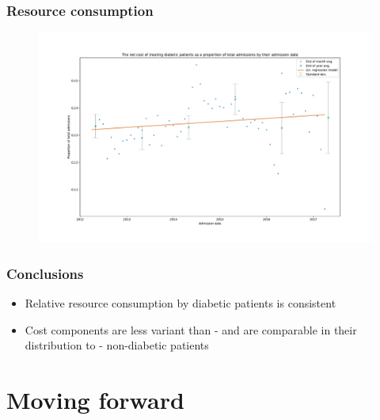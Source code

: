 \documentclass{beamer}
\begin{document}
\begin{frame}
    \frametitle{Resource consumption}

    \begin{figure}
        \includegraphics[width=\linewidth]
            {./img/diabetic_netcost_proportions.pdf}
    \end{figure}
\end{frame}

\begin{frame}
    \frametitle{Conclusions}

    \begin{itemize}
        \item Relative resource consumption by diabetic patients is consistent
        \item Cost components are less variant than \-- and are comparable in
            their distribution to \-- non-diabetic patients
    \end{itemize}
\end{frame}

\section{Moving forward}
\end{document}
